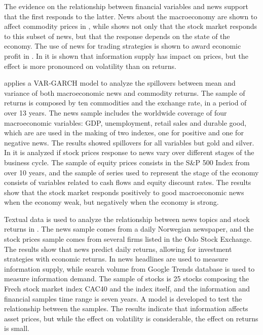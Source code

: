 \documentclass[cic,tc, english]{iiufrgs}
\begin{document}
    The evidence on the relationship between financial variables and news support that the first responds to the latter. News about the macroeconomy are shown to affect commodity prices in \citet{caporaleetal2015}, while \citet{macqueenroley1993} shows not only that the stock market responds to this subset of news, but that the response depends on the state of the economy. The use of news for trading strategies is shown to award economic profit in \citet{larsenthorsrud2017}. In \citet{moussaetal2017} it is shown that information supply has impact on prices, but the effect is more pronounced on volatility than on returns.

    \citet{caporaleetal2015} applies a VAR-GARCH model to analyze the spillovers between mean and variance of both macroeconomic news and commodity returns. The sample of returns is composed by ten commodities and the exchange rate, in a period of over 13 years. The news sample includes the worldwide coverage of four macroeconomic variables: GDP, unemployment, retail sales and durable good, which are are used in the making of two indexes, one for positive and one for negative news. The results showed spillovers for all variables but gold and silver.
    In \citet{macqueenroley1993} it is analyzed if stock prices response to news vary over different stages of the business cycle. The sample of equity prices consists in the S\&P 500 Index from over 10 years, and the sample of series used to represent the stage of the economy consists of variables related to cash flows and equity discount rates. The results show that the stock market responds positively to good macroeconomic news when the economy weak, but negatively when the economy is strong.

    Textual data is used to analyze the relationship between news topics and stock returns in \citet{larsenthorsrud2017}. The news sample comes from a daily Norwegian newspaper, and the stock prices sample comes from several firms listed in the Oslo Stock Exchange. The results show that news predict daily returns, allowing for investment strategies with economic returns.
    In \citet{moussaetal2017} news headlines are used to measure information supply, while search volume from Google Trends database is used to measure information demand. The sample of stocks is 25 stocks composing the Frech stock market index CAC40 and the index itself, and the information and financial samples time range is seven years. A model is developed to test the relationship between the samples. The results indicate that information affects asset prices, but while the effect on volatility is considerable, the effect on returns is small.
\end{document}
